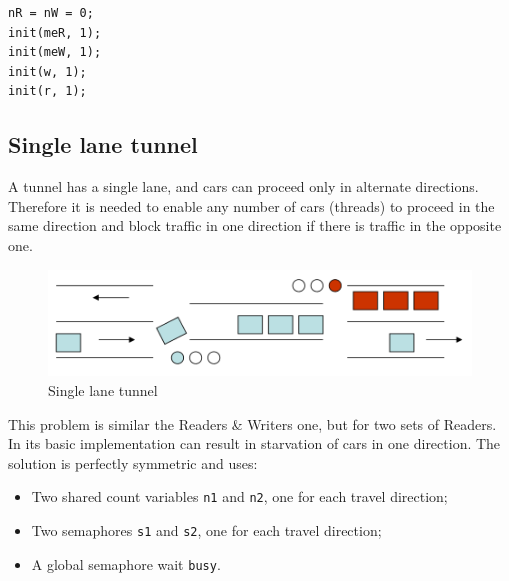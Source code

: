 \begin{verbatim}
nR = nW = 0;
init(meR, 1);
init(meW, 1);
init(w, 1);
init(r, 1);
\end{verbatim}

\begin{Parallel}{}{}
\end{Parallel}

\subsection{Single lane tunnel}
A tunnel has a single lane, and cars can proceed only in alternate directions. Therefore it is needed to enable any number of cars (threads) to proceed in the same direction and block traffic in one direction if there is traffic in the opposite one.

\begin{figure}[hbtp]
\centering
\includegraphics[scale=0.4]{images/synchronization/single_lane_tunnel.png}
\caption{Single lane tunnel}
\end{figure}

This problem is similar the Readers \& Writers one, but for two sets of Readers. In its basic implementation can result in starvation of cars in one direction. The solution is perfectly symmetric and uses:
\begin{itemize}
\item Two shared count variables \texttt{n1} and \texttt{n2}, one for each travel direction;
\item Two semaphores \texttt{s1} and \texttt{s2}, one for each travel direction;
\item A global semaphore wait \texttt{busy}.
\end{itemize}

